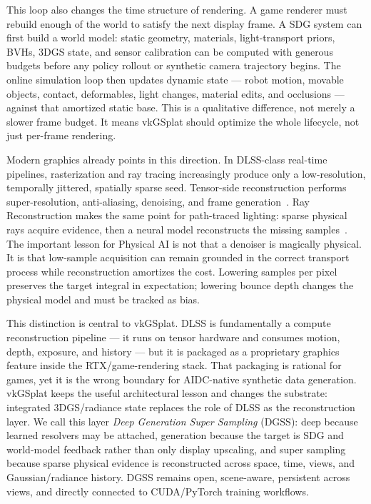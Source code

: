 \documentclass[10pt,journal,onecolumn]{IEEEtran}
\begin{document}
This loop also changes the time structure of rendering. A game renderer must
rebuild enough of the world to satisfy the next display frame. A SDG system can
first build a world model: static geometry, materials, light-transport priors,
BVHs, 3DGS state, and sensor calibration can be computed with generous budgets
before any policy rollout or synthetic camera trajectory begins. The online
simulation loop then updates dynamic state --- robot motion, movable objects,
contact, deformables, light changes, material edits, and occlusions --- against
that amortized static base. This is a qualitative difference, not merely a
slower frame budget. It means vkGSplat should optimize the whole lifecycle,
not just per-frame rendering.

Modern graphics already points in this direction. In DLSS-class real-time
pipelines, rasterization and ray tracing increasingly produce only a
low-resolution, temporally jittered, spatially sparse seed. Tensor-side
reconstruction performs super-resolution, anti-aliasing, denoising, and frame
generation~\cite{nvidia-dlss,liu2020nsrr,nvidia-dlss3}. Ray Reconstruction makes
the same point for path-traced lighting: sparse physical rays acquire evidence,
then a neural model reconstructs the missing samples~\cite{nvidia-dlss35rr}.
The important lesson for Physical AI is not that a denoiser is magically
physical. It is that low-sample acquisition can remain grounded in the correct
transport process while reconstruction amortizes the cost. Lowering samples per
pixel preserves the target integral in expectation; lowering bounce depth
changes the physical model and must be tracked as bias.

This distinction is central to vkGSplat. DLSS is fundamentally a compute
reconstruction pipeline --- it runs on tensor hardware and consumes motion,
depth, exposure, and history --- but it is packaged as a proprietary graphics
feature inside the RTX/game-rendering stack. That packaging is rational for
games, yet it is the wrong boundary for AIDC-native synthetic data generation.
vkGSplat keeps the useful architectural lesson and changes the substrate:
integrated 3DGS/radiance state replaces the role of DLSS as the reconstruction
layer. We call this layer \emph{Deep Generation Super Sampling} (DGSS): deep
because learned resolvers may be attached, generation because the target is SDG
and world-model feedback rather than only display upscaling, and super sampling
because sparse physical evidence is reconstructed across space, time, views, and
Gaussian/radiance history. DGSS remains open, scene-aware, persistent across
views, and directly connected to CUDA/PyTorch training workflows.
\end{document}

